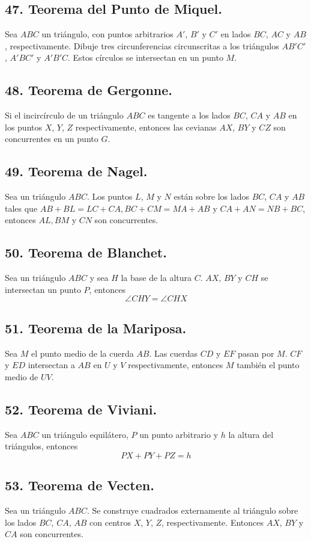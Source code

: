 \documentclass[12pt,a4paper]{article}
\begin{document}
\subsection*{47. Teorema del Punto de Miquel.}
Sea $ABC$ un triángulo, con puntos arbitrarios $A'$, $B'$ y $C'$ en lados $BC$, $AC$ y $AB$ , respectivamente. Dibuje tres circunferencias circunscritas a los triángulos $AB'C'$, $A'BC'$ y $A'B'C$. Estos círculos se intersectan en un punto $M$.
\subsection*{48. Teorema de Gergonne.}
Si el incircírculo de un triángulo $ABC$ es tangente a los lados $BC$, $CA$ y $AB$ en los puntos $X$, $Y$, $Z$ respectivamente, entonces las cevianas  $AX$, $BY$ y $CZ$ son concurrentes en un punto $G.$
\subsection*{49. Teorema de Nagel.}
Sea un triángulo $ABC$. Los puntos $L$, $M$ y $N$ están sobre los lados $BC$, $CA$ y $AB$ tales que $AB + BL = LC + CA, BC + CM= MA + AB$ y $CA + AN= NB + BC$, entonces $AL, BM$ y $CN$ son concurrentes.
\subsection*{50. Teorema de Blanchet.}
Sea un triángulo $ABC$ y sea $H$ la base de la altura $C$. $AX$, $BY$ y $CH$ se intersectan un punto $P$, entonces $$\angle CHY = \angle CHX$$
\subsection*{51. Teorema de la Mariposa.}
Sea $M$ el punto medio de la cuerda $AB$. Las cuerdas $CD$ y $EF$ pasan por $M$. $CF$ y $ED$ intersectan a $AB$ en $U$ y $V$ respectivamente, entonces $M$ también el punto medio de $UV$.
\subsection*{52. Teorema de Viviani.}
Sea $ABC$ un triángulo equilátero, $P$ un punto arbitrario y $h$ la altura del triángulos, entonces $$PX + PY +PZ = h$$
\subsection*{53. Teorema de Vecten.}
Sea un triángulo $ABC$. Se construye cuadrados externamente al triángulo sobre los lados $BC$, $CA$, $AB$ con centros $X$, $Y$, $Z$, respectivamente. Entonces $AX$, $BY$ y $CA$ son concurrentes.
\end{document}
